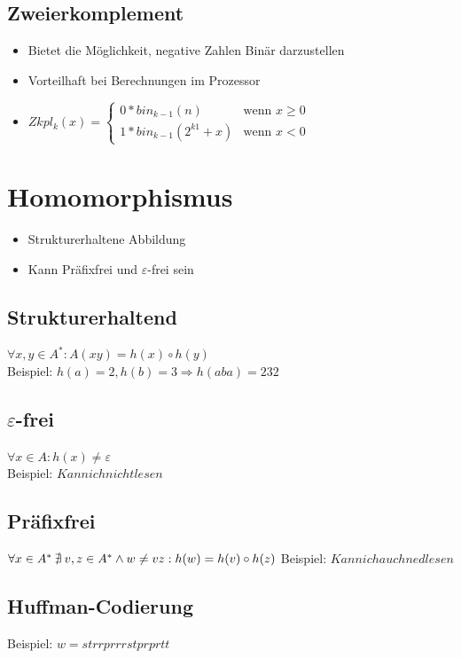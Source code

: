 \documentclass[a4paper,portrait]{scrartcl}
\begin{document}
\subsection{Zweierkomplement}
\begin{itemize}
\item Bietet die Möglichkeit, negative Zahlen Binär darzustellen
\item Vorteilhaft bei Berechnungen im Prozessor
\item $Zkpl_{k}(x) = \begin{cases}
0 * bin_{k-1}(n)&\text{wenn } x\geq 0 \\
1 * bin_{k-1}(2^{k1}+x)&\text{wenn } x<0
\end{cases}$
\end{itemize}
\section{Homomorphismus}
\begin{itemize}
\item Strukturerhaltene Abbildung
\item Kann Präfixfrei und $\varepsilon$-frei sein
\end{itemize}
\subsection{Strukturerhaltend}
$ \forall x,y \in A^{*}: A(xy) = h(x)\circ h(y) $ \\
Beispiel: $h(a) = 2, h(b) = 3 \Rightarrow h(aba) = 232$ 
\subsection{$\varepsilon$-frei}
$ \forall x \in A: h(x) \neq \varepsilon $ \\
Beispiel: $ Kann ich nicht lesen $
\subsection{Präfixfrei}
$ \forall x \in A^{*}\: \nexists \:v,z \in A^{*} \wedge w \neq vz: h(w) = h(v) \circ h(z) \\ $
Beispiel: $ Kann ich auch ned lesen $
\subsection{Huffman-Codierung}
Beispiel: $ w = strrprrrstprprtt $ \\

\end{document}
